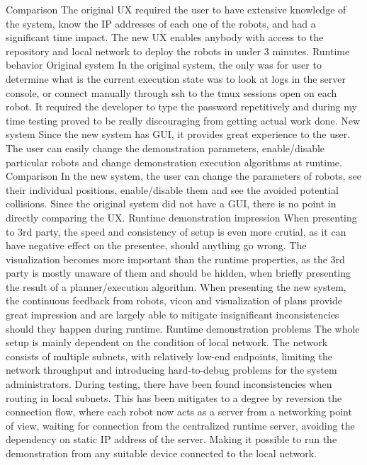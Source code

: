 \secc Comparison
The original UX required the user to have extensive knowledge of the system, know the IP addresses of each one of the robots, and had a significant time impact. The new UX enables anybody with access to the repository and local network to deploy the robots in under 3 minutes.
\sec Runtime behavior
\secc Original system
In the original system, the only was for user to determine what is the current execution state was to look at logs in the server console, or connect manually through ssh to the tmux sessions open on each robot. It required the developer to type the password repetitively and during my time testing proved to be really discouraging from getting actual work done.
\secc New system
Since the new system has GUI, it provides great experience to the user. The user can easily change the demonstration parameters, enable/disable particular robots and change demonstration execution algorithms at runtime.
\secc Comparison
In the new system, the user can change the parameters of robots, see their individual positions, enable/disable them and see the avoided potential collisions. Since the original system did not have a GUI, there is no point in directly comparing the UX. 
\sec Runtime demonstration impression
When presenting to 3rd party, the speed and consistency of setup is even more crutial, as it can have negative effect on the presentee, should anything go wrong. The visualization becomes more important than the runtime properties, as the 3rd party is mostly unaware of them and should be hidden, when briefly presenting the result of a planner/execution algorithm. When presenting the new system, the continuous feedback from robots, vicon and visualization of plans provide great impression and are largely able to mitigate insignificant inconsistencies should they happen during runtime.
\sec Runtime demonstration problems
The whole setup is mainly dependent on the condition of local network. The network consists of multiple subnets, with relatively low-end endpoints, limiting the network throughput and introducing hard-to-debug problems for the system administrators. During testing, there have been found inconsistencies when routing in local subnets. This has been mitigates to a degree by reversion the connection flow, where each robot now acts as a server from a networking point of view, waiting for connection from the centralized runtime server, avoiding the dependency on static IP address of the server. Making it possible to run the demonstration from any suitable device connected to the local network.
